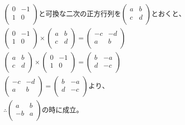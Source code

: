 \documentclass[dvipdfmx,uplatex]{jsarticle}
\begin{document}
  \begin{equation}
    \begin{aligned}
        &\begin{pmatrix} 0 & -1 \\ 1 & 0 \\ \end{pmatrix}と可換な二次の正方行列を\begin{pmatrix} a & b \\ c & d \\ \end{pmatrix}とおくと、\nonumber\\
        &\begin{pmatrix} 0 & -1 \\ 1 & 0 \\ \end{pmatrix} \times \begin{pmatrix} a & b \\ c & d \\ \end{pmatrix} = \begin{pmatrix} -c & -d \\ a & b \\ \end{pmatrix} \nonumber\\
        &\begin{pmatrix} a & b \\ c & d \\ \end{pmatrix} \times \begin{pmatrix} 0 & -1 \\ 1 & 0 \\ \end{pmatrix} = \begin{pmatrix} b & -a \\ d & -c \\ \end{pmatrix} \nonumber\\
        &\begin{pmatrix} -c & -d \\ a & b \\ \end{pmatrix} = \begin{pmatrix} b & -a \\ d & -c \\ \end{pmatrix}より、 \nonumber\\
        & \therefore\begin{pmatrix} a & b \\ -b & a \\ \end{pmatrix}の時に成立。\nonumber\\

\end{aligned}
\end{equation}
\end{document}
